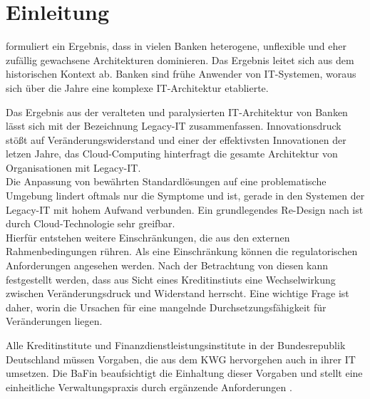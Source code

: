\chapter{Einleitung}
\label{ch:intro}

\citet{Brockhoff2006} formuliert ein Ergebnis, dass in vielen Banken heterogene, unflexible und eher zufällig gewachsene Architekturen dominieren. Das Ergebnis leitet sich aus dem historischen Kontext ab. Banken sind frühe Anwender von IT-Systemen, woraus sich über die Jahre eine komplexe IT-Architektur etablierte.

Das Ergebnis aus der veralteten und paralysierten IT-Architektur von Banken lässt sich mit der Bezeichnung Legacy-IT \cite{Dorschel2018, Strietzel2018} zusammenfassen.
Innovationsdruck stößt auf Veränderungswiderstand und einer der effektivsten Innovationen der letzen Jahre, das Cloud-Computing hinterfragt die gesamte Architektur von Organisationen mit Legacy-IT.
\medskip
\\
Die Anpassung von bewährten Standardlösungen auf eine problematische Umgebung \cite{Bussmann2006, Brockhoff2006, Strietzel2018} lindert oftmals nur die Symptome und ist, gerade in den Systemen der Legacy-IT mit hohem Aufwand verbunden. Ein grundlegendes Re-Design nach \citet[27]{Bussmann2006} ist durch Cloud-Technologie sehr greifbar.
\medskip
\\
Hierfür entstehen weitere Einschränkungen, die aus den externen Rahmenbedingungen rühren. Als eine Einschränkung können die regulatorischen Anforderungen \cite{MaRisk:2017} angesehen werden. Nach der Betrachtung von diesen kann festgestellt werden, dass aus Sicht eines Kreditinstiuts eine Wechselwirkung zwischen Veränderungsdruck und Widerstand herrscht. Eine wichtige Frage ist daher, worin die Ursachen für eine mangelnde Durchsetzungsfähigkeit für Veränderungen liegen.

Alle Kreditinstitute und Finanzdienstleistungsinstitute in der Bundesrepublik Deutschland müssen Vorgaben, die aus dem \ac{KWG} hervorgehen auch in ihrer IT umsetzen. Die \ac{BaFin} beaufsichtigt die Einhaltung dieser Vorgaben und stellt eine einheitliche Verwaltungspraxis \cite{BaFin:Verwaltungspraxis} durch ergänzende Anforderungen \cite{MaRisk:2017, BAIT:2018}. 

